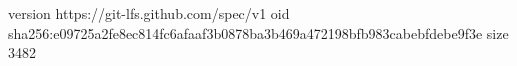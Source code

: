 version https://git-lfs.github.com/spec/v1
oid sha256:e09725a2fe8ec814fc6afaaf3b0878ba3b469a472198bfb983cabebfdebe9f3e
size 3482
